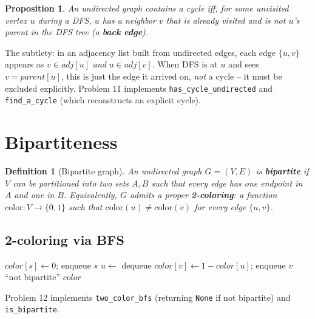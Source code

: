 \documentclass[11pt]{article}
\newtheorem{proposition}[theorem]{Proposition}
\newtheorem{definition}[theorem]{Definition}
\begin{document}
\begin{proposition}
An undirected graph contains a cycle iff, for some unvisited vertex $u$ during a DFS,
$u$ has a neighbor $v$ that is already visited and is \emph{not} $u$'s parent in the DFS
tree (a \textbf{back edge}).
\end{proposition}

The subtlety: in an adjacency list built from undirected edges, each edge $\{u,v\}$
appears as $v \in adj[u]$ \emph{and} $u \in adj[v]$. When DFS is at $u$ and sees $v =
parent[u]$, this is just the edge it arrived on, \emph{not} a cycle -- it must be
excluded explicitly. Problem 11 implements \texttt{has\_cycle\_undirected} and
\texttt{find\_a\_cycle} (which reconstructs an explicit cycle).

\section{Bipartiteness}

\begin{definition}[Bipartite graph]
An undirected graph $G = (V,E)$ is \textbf{bipartite} if $V$ can be partitioned into two
sets $A, B$ such that every edge has one endpoint in $A$ and one in $B$. Equivalently, $G$
admits a proper \textbf{2-coloring}: a function $\mathrm{color}: V \to \{0,1\}$ such that
$\mathrm{color}(u) \ne \mathrm{color}(v)$ for every edge $\{u,v\}$.
\end{definition}

\subsection{2-coloring via BFS}

\begin{algorithm}[h]
\caption{2-Color$(adj)$}
\begin{algorithmic}[1]
    \State $color[s] \gets 0$; enqueue $s$
        \State $u \gets$ dequeue
                \State $color[v] \gets 1 - color[u]$; enqueue $v$
                \State \Return ``not bipartite''
            \EndIf
        \EndFor
    \EndWhile
\EndFor
\State \Return $color$
\end{algorithmic}
\end{algorithm}

Problem 12 implements \texttt{two\_color\_bfs} (returning \texttt{None} if not
bipartite) and \texttt{is\_bipartite}.
\end{document}
